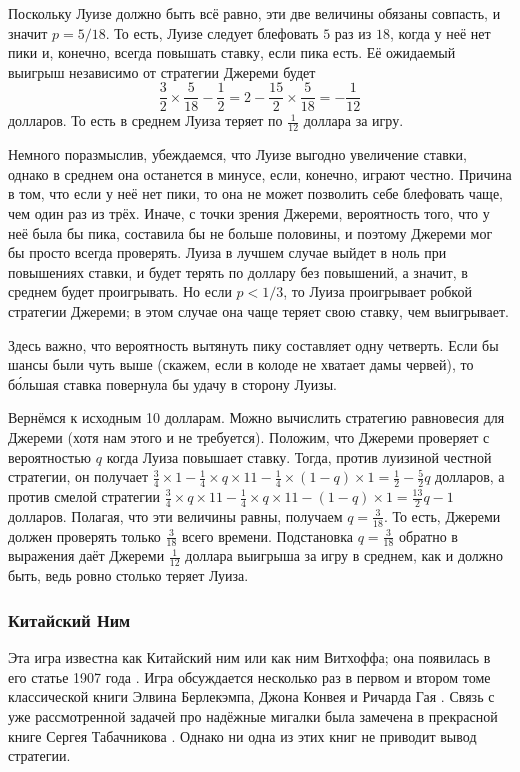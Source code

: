 Поскольку Луизе должно быть всё равно, эти две величины обязаны совпасть, и значит $p = 5/18$.
То есть, Луизе следует блефовать $5$ раз из $18$, когда у неё нет пики и, конечно, всегда повышать ставку, если пика есть.
Её ожидаемый выигрыш независимо от стратегии Джереми будет
\[\frac32\times\frac5{18}-\frac12=2-\frac{15}2\times\frac5{18}=-\frac1{12}\]
долларов.
То есть в среднем Луиза теряет по $\tfrac1{12}$ доллара за игру.

Немного поразмыслив, убеждаемся, что Луизе выгодно увеличение ставки,
однако в среднем она останется в минусе, если, конечно, играют честно.
Причина в том, что если у неё нет пики, то она не может позволить себе блефовать чаще, чем один раз из трёх.
Иначе, с точки зрения Джереми, вероятность того, что у неё была бы пика, составила бы не больше половины, и поэтому Джереми мог бы просто всегда проверять.
Луиза в лучшем случае выйдет в ноль при повышениях ставки, и будет терять по доллару без повышений, а значит, в среднем будет проигрывать.
Но если $p < 1/3$, то Луиза проигрывает робкой стратегии Джереми;
в этом случае она чаще теряет свою ставку, чем выигрывает.

Здесь важно, что вероятность вытянуть пику составляет одну четверть.
Если бы шансы были чуть выше (скажем, если в колоде не хватает дамы червей), то б\'{о}льшая ставка повернула бы удачу в сторону Луизы.

Вернёмся к исходным 10 долларам.
Можно вычислить стратегию равновесия для Джереми (хотя нам этого и не требуется).
Положим, что Джереми проверяет с вероятностью $q$ когда Луиза повышает ставку.
Тогда, против луизиной честной стратегии, он получает $\tfrac34 \times 1 - \tfrac14 \times q \times 11 - \tfrac14 \times (1 - q) \times 1 = \tfrac12 - \tfrac52q$ долларов,
а против смелой стратегии $\tfrac34 \times q \times 11 - \tfrac14 \times q \times 11 - (1 - q) \times 1 = \tfrac{13}2q - 1$ долларов.
Полагая, что эти величины равны, получаем $q = \tfrac3{18}$.
То есть, Джереми должен проверять только $\tfrac3{18}$ всего времени.
Подстановка $q = \tfrac3{18}$ обратно в выражения даёт Джереми $\tfrac1{12}$ доллара выигрыша за игру в среднем, как и должно быть, ведь ровно столько теряет Луиза.

\subsubsection*{Китайский Ним}

Эта игра известна как Китайский ним или как ним  Витхоффа;
она появилась в его статье 1907 года \cite{60}.
Игра обсуждается несколько раз в первом и втором томе классической книги Элвина Берлекэмпа, Джона Конвея и Ричарда  Гая \cite{4}.
Связь с уже рассмотренной задачей про надёжные мигалки была замечена в прекрасной книге Сергея Табачникова \cite{56}.
Однако ни одна из этих книг не приводит вывод стратегии.

